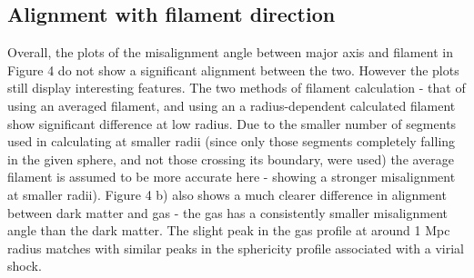 \documentclass[journal]{IEEEtran}
\begin{document}
\subsection{Alignment with filament direction}
Overall, the plots of the misalignment angle between major axis and filament in Figure 4 do not show a significant alignment between the two. However the plots still display interesting features. The two methods of filament calculation - that of using an averaged filament, and using an a radius-dependent calculated filament show significant difference at low radius. Due to the smaller number of segments used in calculating at smaller radii (since only those segments completely falling in the given sphere, and not those crossing its boundary, were used) the average filament is assumed to be more accurate here - showing a stronger misalignment at smaller radii). Figure 4 b) also shows a much clearer difference in alignment between dark matter and gas - the gas has a consistently smaller misalignment angle than the dark matter. The slight peak in the gas profile at around 1 Mpc radius matches with similar peaks in the sphericity profile associated with a virial shock. 

\end{document}
